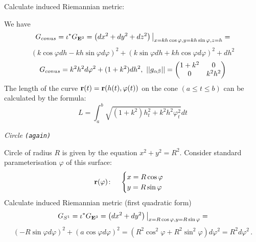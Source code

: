 \documentclass[12pt]{article}
\theoremstyle{theorem}
\numberwithin{equation}{section}
\begin{document}
\medskip

   Calculate induced Riemannian metric:

We have               $$
             G_{conus}=\iota^*G_{{\bf E}^3}=\left(dx^2+dy^2+dz^2\right)
\big\vert_{x=kh\cos\varphi,y=kh\sin\varphi,z=h}=
                      $$
                      $$
                      (k\cos\varphi dh-kh\sin\varphi d\varphi)^2+
             (k\sin\varphi dh+kh\cos\varphi d\varphi)^2+dh^2
                      $$
        \begin{equation}\label{firstquadraticformforconus}
            G_{conus} =k^2h^2d\varphi^2+(1+k^2)dh^2,\,\,
                        ||g_{\alpha\beta}||=
   \begin{pmatrix}
   1+k^2 & 0 \\
   0&  k^2h^2 \\
   \end{pmatrix}
                       \end{equation}
The length of the curve ${\bf r}(t)={\bf r} (h(t), \varphi(t))$ on the
  cone
    $(a\leq t\leq b)$
  can be calculated by the formula:
               \begin{equation}
             L=\int_a^b
             \sqrt{(1+k^2)h_t^2+k^2h^2\varphi_t^2}dt
               \end{equation}

\medskip
 \centerline {\it Circle {\tt (again)}}
  Circle of radius $R$ is given by the equation $x^2+y^2=R^2$. Consider standard parameterisation
  $\varphi$
 of this surface:
\begin{equation*}\label{surfacecircle}
  {\bf r}(\varphi)\colon\quad
  \begin{cases}
  x=R\cos\varphi\\
  y=R\sin\varphi\\
  \end{cases}
\end{equation*}
   Calculate induced Riemannian metric (first quadratic form)
              $$
              G_{S^1}=\iota^*G_{{\bf E}^3}=
    \left(dx^2+dy^2\right)\big\vert_{x=R\cos\varphi,y=R\sin\varphi}=
                      $$
                      $$
                      (-R\sin\varphi d\varphi)^2+
                      (a\cos\varphi d\varphi)^2=
          (R^2\cos^2\varphi+R^2\sin^2\varphi)d\varphi^2=
             R^2 d\varphi^2\,.
             $$
\end{document}

